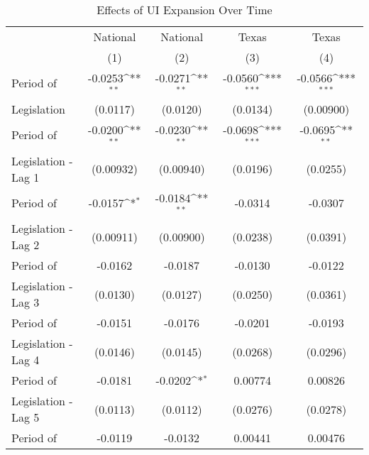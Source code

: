 \begin{table}[htbp]\centering
\def\sym#1{\ifmmode^{#1}\else\(^{#1}\)\fi}
\caption{Effects of UI Expansion Over Time \label{tab:impulseresponsetable}}
\scriptsize
\begin{tabular}{l*{4}{c}}
\hline\hline
        &\multicolumn{1}{c}{National}         &\multicolumn{1}{c}{National}         &\multicolumn{1}{c}{Texas}         &\multicolumn{1}{c}{Texas}         \\
        &\multicolumn{1}{c}{(1)}         &\multicolumn{1}{c}{(2)}         &\multicolumn{1}{c}{(3)}         &\multicolumn{1}{c}{(4)}         \\
\hline
Period of           &     -0.0253\sym{**} &     -0.0271\sym{**} &     -0.0560\sym{***}&     -0.0566\sym{***}\\
Legislation         &    (0.0117)         &    (0.0120)         &    (0.0134)         &   (0.00900)         \\
[1em]
Period of           &     -0.0200\sym{**} &     -0.0230\sym{**} &     -0.0698\sym{***}&     -0.0695\sym{**} \\
Legislation - Lag 1 &   (0.00932)         &   (0.00940)         &    (0.0196)         &    (0.0255)         \\
[1em]
Period of           &     -0.0157\sym{*}  &     -0.0184\sym{**} &     -0.0314         &     -0.0307         \\
Legislation - Lag 2 &   (0.00911)         &   (0.00900)         &    (0.0238)         &    (0.0391)         \\
[1em]
Period of           &     -0.0162         &     -0.0187         &     -0.0130         &     -0.0122         \\
Legislation - Lag 3 &    (0.0130)         &    (0.0127)         &    (0.0250)         &    (0.0361)         \\
[1em]
Period of           &     -0.0151         &     -0.0176         &     -0.0201         &     -0.0193         \\
Legislation - Lag 4 &    (0.0146)         &    (0.0145)         &    (0.0268)         &    (0.0296)         \\
[1em]
Period of           &     -0.0181         &     -0.0202\sym{*}  &     0.00774         &     0.00826         \\
Legislation - Lag 5 &    (0.0113)         &    (0.0112)         &    (0.0276)         &    (0.0278)         \\
[1em]
Period of           &     -0.0119         &     -0.0132         &     0.00441         &     0.00476         \\

\end{tabular}
\end{table}

